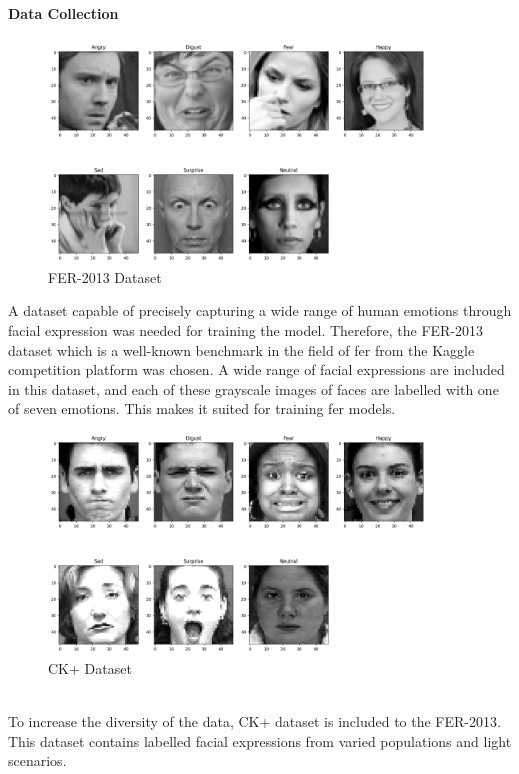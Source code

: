 \paragraph{Data Collection}
\begin{figure}[h!]
    \centering
    \includegraphics[width=10cm]{Images/fer2013.png}
    \caption{FER-2013 Dataset}
    \label{fig:fer2013}
\end{figure}
A dataset capable of precisely capturing a wide range of human emotions through facial expression was needed for training the model. 
Therefore, the FER-2013 \citep{challenges_in_representation_learning_facial_expression_recognition_challenge} dataset which is a well-known benchmark in the field of  \gls{fer} from the Kaggle competition platform was chosen.
A wide range of facial expressions are included in this dataset, and each of these grayscale images of faces are labelled with one of seven emotions.
This makes it suited for training \gls{fer} models.
\begin{figure}[h!]
    \centering
    \includegraphics[width=10cm]{Images/ckextended.png}
    \caption{CK+ Dataset}
    \label{fig:ckextended}
\end{figure}
\\
\indent To increase the diversity of the data, CK+ \citep{5543262} dataset is included to the FER-2013. 
This dataset contains labelled facial expressions from varied populations and light scenarios.
